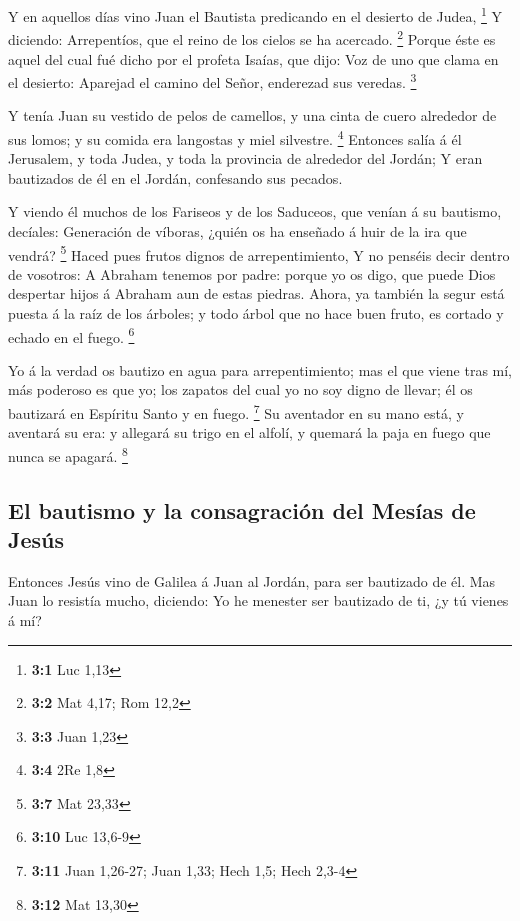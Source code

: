  Y en aquellos días vino Juan el Bautista predicando en el
desierto de Judea, \footnote{\textbf{3:1} Luc 1,13}  Y
diciendo: Arrepentíos, que el reino de los cielos se ha acercado.
\footnote{\textbf{3:2} Mat 4,17; Rom 12,2}  Porque éste es
aquel del cual fué dicho por el profeta Isaías, que dijo: Voz de uno que
clama en el desierto: Aparejad el camino del Señor, enderezad sus
veredas. \footnote{\textbf{3:3} Juan 1,23}

 Y tenía Juan su vestido de pelos de camellos, y una cinta
de cuero alrededor de sus lomos; y su comida era langostas y miel
silvestre. \footnote{\textbf{3:4} 2Re 1,8}  Entonces salía á
él Jerusalem, y toda Judea, y toda la provincia de alrededor del Jordán;
 Y eran bautizados de él en el Jordán, confesando sus
pecados.

 Y viendo él muchos de los Fariseos y de los Saduceos, que
venían á su bautismo, decíales: Generación de víboras, ¿quién os ha
enseñado á huir de la ira que vendrá? \footnote{\textbf{3:7} Mat 23,33}
 Haced pues frutos dignos de arrepentimiento,  Y
no penséis decir dentro de vosotros: A Abraham tenemos por padre: porque
yo os digo, que puede Dios despertar hijos á Abraham aun de estas
piedras.  Ahora, ya también la segur está puesta á la raíz
de los árboles; y todo árbol que no hace buen fruto, es cortado y echado
en el fuego. \footnote{\textbf{3:10} Luc 13,6-9}

 Yo á la verdad os bautizo en agua para arrepentimiento;
mas el que viene tras mí, más poderoso es que yo; los zapatos del cual
yo no soy digno de llevar; él os bautizará en Espíritu Santo y en fuego.
\footnote{\textbf{3:11} Juan 1,26-27; Juan 1,33; Hech 1,5; Hech 2,3-4}
 Su aventador en su mano está, y aventará su era: y
allegará su trigo en el alfolí, y quemará la paja en fuego que nunca se
apagará. \footnote{\textbf{3:12} Mat 13,30}

\hypertarget{el-bautismo-y-la-consagraciuxf3n-del-mesuxedas-de-jesuxfas}{%
\subsection{El bautismo y la consagración del Mesías de
Jesús}\label{el-bautismo-y-la-consagraciuxf3n-del-mesuxedas-de-jesuxfas}}

 Entonces Jesús vino de Galilea á Juan al Jordán, para ser
bautizado de él.  Mas Juan lo resistía mucho, diciendo: Yo
he menester ser bautizado de ti, ¿y tú vienes á mí?

